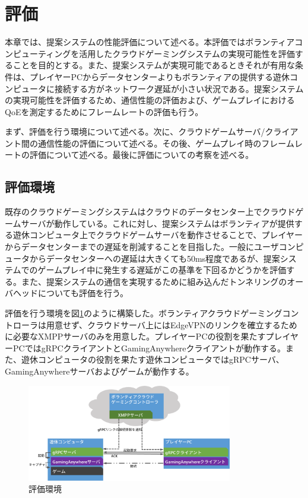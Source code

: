 \section{評価}
本章では、提案システムの性能評価について述べる。本評価ではボランティアコンピューティングを活用したクラウドゲーミングシステムの実現可能性を評価することを目的とする。また、提案システムが実現可能であるときそれが有用な条件は、プレイヤーPCからデータセンターよりもボランティアの提供する遊休コンピュータに接続する方がネットワーク遅延が小さい状況である。提案システムの実現可能性を評価するため、通信性能の評価および、ゲームプレイにおけるQoEを測定するためにフレームレートの評価も行う。

まず、評価を行う環境について述べる。次に、クラウドゲームサーバ/クライアント間の通信性能の評価について述べる。その後、ゲームプレイ時のフレームレートの評価について述べる。最後に評価についての考察を述べる。

\subsection{評価環境}
既存のクラウドゲーミングシステムはクラウドのデータセンター上でクラウドゲームサーバが動作している。これに対し、提案システムはボランティアが提供する遊休コンピュータ上でクラウドゲームサーバを動作させることで、プレイヤーからデータセンターまでの遅延を削減することを目指した。一般にユーザコンピュータからデータセンターへの遅延は大きくても50ms程度であるが、提案システムでのゲームプレイ中に発生する遅延がこの基準を下回るかどうかを評価する。また、提案システムの通信を実現するために組み込んだトンネリングのオーバヘッドについても評価を行う。

評価を行う環境を図\ref{fig:expenv}のように構築した。ボランティアクラウドゲーミングコントローラは用意せず、クラウドサーバ上にはEdgeVPNのリンクを確立するために必要なXMPPサーバのみを用意した。プレイヤーPCの役割を果たすプレイヤーPCではgRPCクライアントとGamingAnywhereクライアントが動作する。また、遊休コンピュータの役割を果たす遊休コンピュータではgRPCサーバ、GamingAnywhereサーバおよびゲームが動作する。

\begin{figure}[t]
    \centering
    \includegraphics[width=0.8\textwidth,keepaspectratio,clip]{img/experimentalenvironment.eps}
    \caption{評価環境}
    \label{fig:expenv}
\end{figure}

